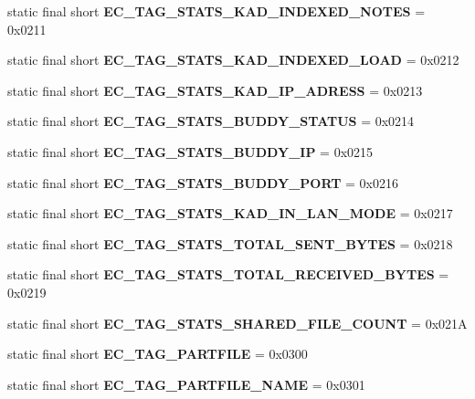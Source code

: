 \begin{DoxyCompactItemize}
\item 
static final short {\bfseries EC\_\-TAG\_\-STATS\_\-KAD\_\-INDEXED\_\-NOTES} = 0x0211\label{interfaceECCodes_aa522b2daeab68e74860002cc4b0c2540}

\item 
static final short {\bfseries EC\_\-TAG\_\-STATS\_\-KAD\_\-INDEXED\_\-LOAD} = 0x0212\label{interfaceECCodes_a8bbcb96a40f954eb59bf7510972e9c72}

\item 
static final short {\bfseries EC\_\-TAG\_\-STATS\_\-KAD\_\-IP\_\-ADRESS} = 0x0213\label{interfaceECCodes_a7e1045b099ea15f220e71e606e381e10}

\item 
static final short {\bfseries EC\_\-TAG\_\-STATS\_\-BUDDY\_\-STATUS} = 0x0214\label{interfaceECCodes_a6099094aac12c667d47b66045e244f2f}

\item 
static final short {\bfseries EC\_\-TAG\_\-STATS\_\-BUDDY\_\-IP} = 0x0215\label{interfaceECCodes_a6cb514866fc600c4405540951043a289}

\item 
static final short {\bfseries EC\_\-TAG\_\-STATS\_\-BUDDY\_\-PORT} = 0x0216\label{interfaceECCodes_ae363fc09282ff63dabed60e047acda39}

\item 
static final short {\bfseries EC\_\-TAG\_\-STATS\_\-KAD\_\-IN\_\-LAN\_\-MODE} = 0x0217\label{interfaceECCodes_ae50e39cc7d49a40b91200bfcb99eb4d1}

\item 
static final short {\bfseries EC\_\-TAG\_\-STATS\_\-TOTAL\_\-SENT\_\-BYTES} = 0x0218\label{interfaceECCodes_a95aec1e5c5fbc69d470f5ac8ade5cf68}

\item 
static final short {\bfseries EC\_\-TAG\_\-STATS\_\-TOTAL\_\-RECEIVED\_\-BYTES} = 0x0219\label{interfaceECCodes_a4356d80cf633936666b90200f77ce03e}

\item 
static final short {\bfseries EC\_\-TAG\_\-STATS\_\-SHARED\_\-FILE\_\-COUNT} = 0x021A\label{interfaceECCodes_a6e4c222bb7f7e85984e0e77391e3dd9c}

\item 
static final short {\bfseries EC\_\-TAG\_\-PARTFILE} = 0x0300\label{interfaceECCodes_a4b43d6f6fe5273a9a0e80a181ccd395a}

\item 
static final short {\bfseries EC\_\-TAG\_\-PARTFILE\_\-NAME} = 0x0301\label{interfaceECCodes_a2677358afe19b175adecf49e21605ed4}


\end{DoxyCompactItemize}
